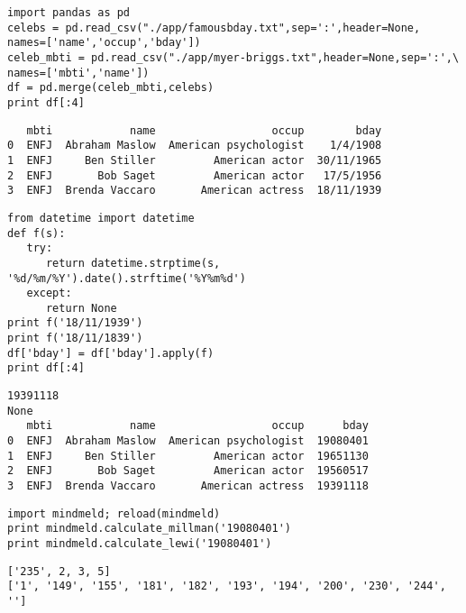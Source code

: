 \documentclass[12pt,fleqn]{article}\usepackage{common}
\begin{document}
\begin{verbatim}
import pandas as pd
celebs = pd.read_csv("./app/famousbday.txt",sep=':',header=None, 
names=['name','occup','bday'])
celeb_mbti = pd.read_csv("./app/myer-briggs.txt",header=None,sep=':',\
names=['mbti','name'])
df = pd.merge(celeb_mbti,celebs)
print df[:4]
\end{verbatim}

\begin{verbatim}
   mbti            name                  occup        bday
0  ENFJ  Abraham Maslow  American psychologist    1/4/1908
1  ENFJ     Ben Stiller         American actor  30/11/1965
2  ENFJ       Bob Saget         American actor   17/5/1956
3  ENFJ  Brenda Vaccaro       American actress  18/11/1939
\end{verbatim}

\begin{verbatim}
from datetime import datetime
def f(s):
   try:
      return datetime.strptime(s, '%d/%m/%Y').date().strftime('%Y%m%d')
   except: 
      return None
print f('18/11/1939')
print f('18/11/1839')
df['bday'] = df['bday'].apply(f)
print df[:4]
\end{verbatim}

\begin{verbatim}
19391118
None
   mbti            name                  occup      bday
0  ENFJ  Abraham Maslow  American psychologist  19080401
1  ENFJ     Ben Stiller         American actor  19651130
2  ENFJ       Bob Saget         American actor  19560517
3  ENFJ  Brenda Vaccaro       American actress  19391118
\end{verbatim}

\begin{verbatim}
import mindmeld; reload(mindmeld)
print mindmeld.calculate_millman('19080401')
print mindmeld.calculate_lewi('19080401')
\end{verbatim}

\begin{verbatim}
['235', 2, 3, 5]
['1', '149', '155', '181', '182', '193', '194', '200', '230', '244', '']
\end{verbatim}

\begin{verbatim}
\end{verbatim}
\end{document}
